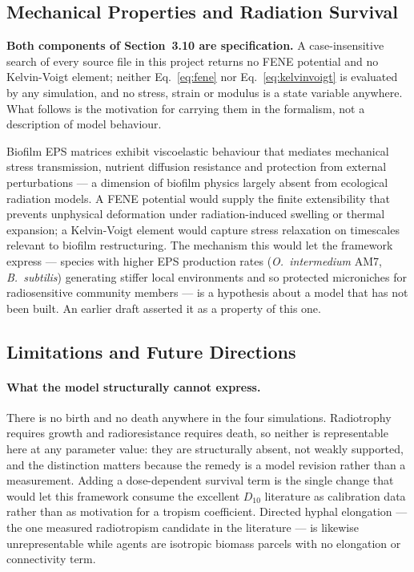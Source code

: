 \documentclass[11pt]{article}
\begin{document}
\subsection{Mechanical Properties and Radiation Survival}

\textbf{Both components of Section~3.10 are specification.} A case-insensitive search of every
source file in this project returns no FENE potential and no Kelvin-Voigt element; neither
Eq.~\ref{eq:fene} nor Eq.~\ref{eq:kelvinvoigt} is evaluated by any simulation, and no stress,
strain or modulus is a state variable anywhere. What follows is the motivation for carrying them in
the formalism, not a description of model behaviour.

Biofilm EPS matrices exhibit viscoelastic behaviour that mediates mechanical stress transmission,
nutrient diffusion resistance and protection from external perturbations --- a dimension of biofilm
physics largely absent from ecological radiation models. A FENE potential would supply the finite
extensibility that prevents unphysical deformation under radiation-induced swelling or thermal
expansion; a Kelvin-Voigt element would capture stress relaxation on timescales relevant to biofilm
restructuring. The mechanism this would let the framework express --- species with higher EPS
production rates (\textit{O.\ intermedium} AM7, \textit{B.\ subtilis}) generating stiffer local
environments and so protected microniches for radiosensitive community members --- is a hypothesis
about a model that has not been built. An earlier draft asserted it as a property of this one.

\subsection{Limitations and Future Directions}
\label{sec:limitations}

\paragraph{What the model structurally cannot express.}
There is no birth and no death anywhere in the four simulations. Radiotrophy requires growth and
radioresistance requires death, so neither is representable here at any parameter value: they are
structurally absent, not weakly supported, and the distinction matters because the remedy is a
model revision rather than a measurement. Adding a dose-dependent survival term is the single
change that would let this framework consume the excellent $D_{10}$ literature as calibration data
rather than as motivation for a tropism coefficient. Directed hyphal elongation --- the one
measured radiotropism candidate in the literature --- is likewise unrepresentable while agents are
isotropic biomass parcels with no elongation or connectivity term.
\end{document}
